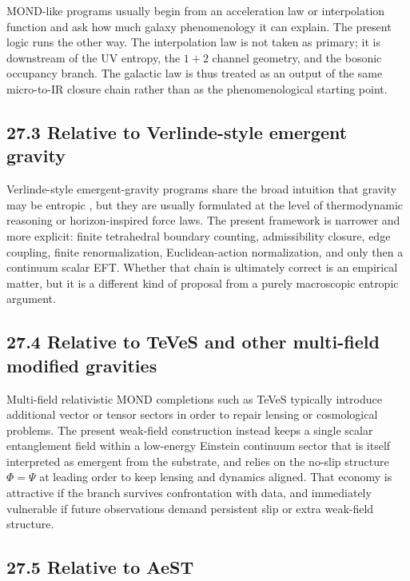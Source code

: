 \documentclass[11pt]{article}
\begin{document}
MOND-like programs \citep{Milgrom1983,SandersMcGaugh2002,FamaeyMcGaugh2012} usually begin from an acceleration law or interpolation function and ask how much galaxy phenomenology it can explain. The present logic runs the other way. The interpolation law is not taken as primary; it is downstream of the UV entropy, the $1+2$ channel geometry, and the bosonic occupancy branch. The galactic law is thus treated as an output of the same micro-to-IR closure chain rather than as the phenomenological starting point.

\subsection{27.3 Relative to Verlinde-style emergent gravity}

Verlinde-style emergent-gravity programs share the broad intuition that gravity may be entropic \citep{Jacobson1995,Padmanabhan2010,Verlinde2011,Verlinde2017}, but they are usually formulated at the level of thermodynamic reasoning or horizon-inspired force laws. The present framework is narrower and more explicit: finite tetrahedral boundary counting, admissibility closure, edge coupling, finite renormalization, Euclidean-action normalization, and only then a continuum scalar EFT. Whether that chain is ultimately correct is an empirical matter, but it is a different kind of proposal from a purely macroscopic entropic argument.

\subsection{27.4 Relative to TeVeS and other multi-field modified gravities}

Multi-field relativistic MOND completions such as TeVeS \citep{Bekenstein2004} typically introduce additional vector or tensor sectors in order to repair lensing or cosmological problems. The present weak-field construction instead keeps a single scalar entanglement field within a low-energy Einstein continuum sector that is itself interpreted as emergent from the substrate, and relies on the no-slip structure $\Phi=\Psi$ at leading order to keep lensing and dynamics aligned. That economy is attractive if the branch survives confrontation with data, and immediately vulnerable if future observations demand persistent slip or extra weak-field structure.

\subsection{27.5 Relative to AeST}
\end{document}
